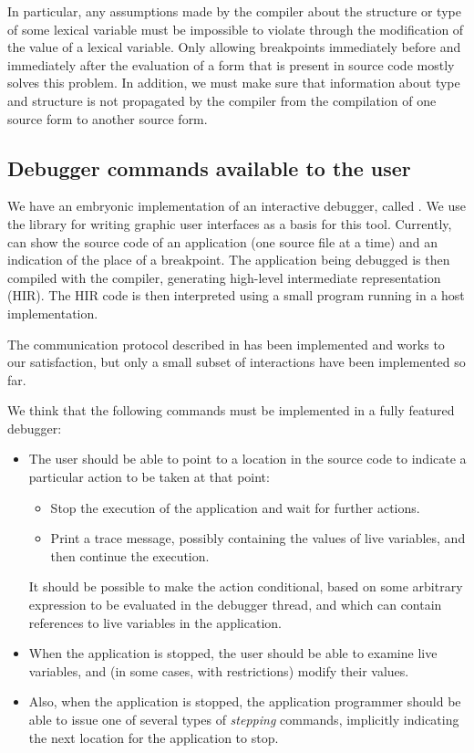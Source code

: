 In particular, any assumptions made by the compiler about the
structure or type of some lexical variable must be impossible to
violate through the modification of the value of a lexical variable.
Only allowing breakpoints immediately before and immediately after the
evaluation of a form that is present in source code mostly solves this
problem.  In addition, we must make sure that information about type
and structure is not propagated by the compiler from the compilation
of one source form to another source form.

\subsection{Debugger commands available to the user}

We have an embryonic implementation of an interactive debugger, called
\clordane{}.  We use the \mcclim{} library for writing graphic user
interfaces as a basis for this tool.  Currently, \clordane{} can show
the source code of an application (one source file at a time) and an
indication of the place of a breakpoint.  The application being
debugged is then compiled with the \sicl{} compiler, generating
high-level intermediate representation (HIR).  The HIR code is then
interpreted using a small program running in a host \commonlisp{}
implementation.

The communication protocol described in
 has been implemented
and works to our satisfaction, but only a small subset of interactions
have been implemented so far.

We think that the following commands must be implemented in a fully
featured debugger:

\begin{itemize}
\item The user should be able to point to a location
  in the source code to indicate a particular action to be taken at
  that point:
  \begin{itemize}
  \item Stop the execution of the application and wait for further
    actions.
  \item Print a trace message, possibly containing the values of live
    variables, and then continue the execution. 
  \end{itemize}
  It should be possible to make the action conditional, based on some
  arbitrary expression to be evaluated in the debugger thread, and
  which can contain references to live variables in the application.
\item When the application is stopped, the user
  should be able to examine live variables, and (in some cases, with
  restrictions) modify their values.
\item Also, when the application is stopped, the application
  programmer should be able to issue one of several types of
  \emph{stepping} commands, implicitly indicating the next location
  for the application to stop.
\end{itemize}
